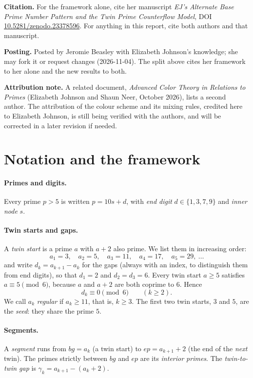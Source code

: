 \documentclass[11pt]{article}
\theoremstyle{plain}
\theoremstyle{definition}
\theoremstyle{remark}
\begin{document}
\noindent
\textbf{Citation.} For the framework alone, cite her manuscript
\emph{EJ's Alternate Base Prime Number Pattern and the Twin Prime Counterflow Model},
DOI \href{https://doi.org/10.5281/zenodo.23378596}{10.5281/zenodo.23378596}.
For anything in this report, cite both authors and that manuscript.

\smallskip
\noindent\textbf{Posting.} Posted by Jeromie Beasley with Elizabeth Johnson's knowledge; she may fork it or request changes (2026-11-04). The split above cites her framework to her alone and the new results to both.

\smallskip
\noindent\textbf{Attribution note.} A related document, \emph{Advanced Color Theory in Relations to
Primes} (Elizabeth Johnson and Shaun Neer, October 2026), lists a second author. The attribution of
the colour scheme and its mixing rules, credited here to Elizabeth Johnson, is still being verified
with the authors, and will be corrected in a later revision if needed.

\section{Notation and the framework}

\paragraph{Primes and digits.} Every prime $p>5$ is written $p=10s+d$, with \emph{end digit}
$d\in\{1,3,7,9\}$ and \emph{inner node} $s$.

\paragraph{Twin starts and gaps.} A \emph{twin start} is a prime $a$ with $a+2$ also prime. We list
them in increasing order:
\[
a_1=3,\quad a_2=5,\quad a_3=11,\quad a_4=17,\quad a_5=29,\ \dots
\]
and write $d_k=a_{k+1}-a_k$ for the gaps (always with an index, to distinguish them from end
digits), so that $d_1=2$ and $d_2=d_3=6$. Every twin start
$a\ge5$ satisfies $a\equiv5\pmod 6$, because $a$ and $a+2$ are both coprime to $6$. Hence
\begin{equation}\label{eq:mod6}
d_k\equiv 0 \pmod 6\qquad (k\ge 2).
\end{equation}
We call $a_k$ \emph{regular} if $a_k\ge 11$, that is, $k\ge3$. The first two twin starts, $3$ and
$5$, are the \emph{seed}: they share the prime $5$.

\paragraph{Segments.} A \emph{segment} runs from $bg=a_k$ (a twin start) to $ep=a_{k+1}+2$ (the end
of the \emph{next} twin). The primes strictly between $bg$ and $ep$ are its \emph{interior primes}.
The \emph{twin-to-twin gap} is $\gamma_k=a_{k+1}-(a_k+2)$.
\end{document}
